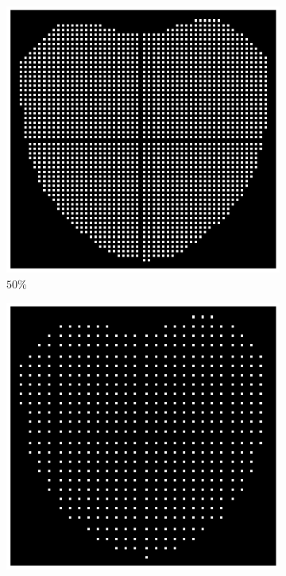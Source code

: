 \begin{figure}[t!]
\begin{subfigure}{0.16\textwidth}
		\includegraphics[width=\textwidth]{figures/sampling_50.png}
		\caption{$50\%$}
		\label{fig:sampling_50}
	\end{subfigure}
	\begin{subfigure}{0.16\textwidth}
		\includegraphics[width=\textwidth]{figures/sampling_25.png}

\end{subfigure}
\end{figure}
